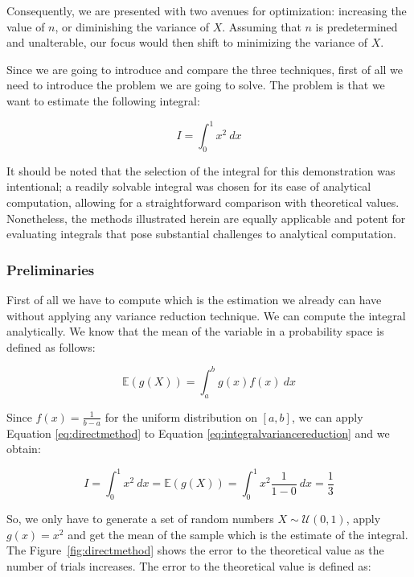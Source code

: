 \documentclass{article}
\begin{document}
Consequently, we are presented with two avenues for optimization: increasing the value of \(n\), or diminishing the variance of \(X\). Assuming that \(n\) is predetermined and unalterable, our focus would then shift to minimizing the variance of \(X\).

Since we are going to introduce and compare the three techniques, first of all we need to introduce the problem we are going to solve. The problem is that we want to estimate the following integral:

\begin{equation} \label{eq:integralvariancereduction} I = \int_{0}^{1} x^2 \ dx \end{equation}

It should be noted that the selection of the integral for this demonstration was intentional; a readily solvable integral was chosen for its ease of analytical computation, allowing for a straightforward comparison with theoretical values. Nonetheless, the methods illustrated herein are equally applicable and potent for evaluating integrals that pose substantial challenges to analytical computation.

\subsubsection{Preliminaries}
\label{sec:variance_reduction_preliminaries}

First of all we have to compute which is the estimation we already can have without applying any variance reduction technique. We can compute the integral analytically. We know that the mean of the variable in a probability space is defined as follows:

\begin{equation} 
	\label{eq:directmethod} 
	\mathbb{E}(g(X)) = \int_a^b g(x)f(x) \ dx
\end{equation}

Since \(f(x) = \frac{1}{b-a}\) for the uniform distribution on \([a,b]\), we can apply Equation \eqref{eq:directmethod} to Equation \eqref{eq:integralvariancereduction} and we obtain:

\begin{equation} \label{eq:directmethodintegral} I = \int_{0}^{1} x^2 \ dx = \mathbb{E}(g(X)) = \int_0^1 x^2 \frac{1}{1-0} \ dx = \frac{1}{3} \end{equation}

So, we only have to generate a set of random numbers \(X \sim \mathcal{U}(0,1)\), apply \(g(x) = x^2\) and get the mean of the sample which is the estimate of the integral. The Figure~\ref{fig:directmethod} shows the error to the theoretical value as the number of trials increases. The error to the theoretical value is defined as:
\end{document}
